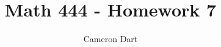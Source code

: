 \documentclass[12pt]{article}
\begin{document}
	\title{Math 444 - Homework 7}
	\author{Cameron Dart}
	\maketitle
\end{document}
